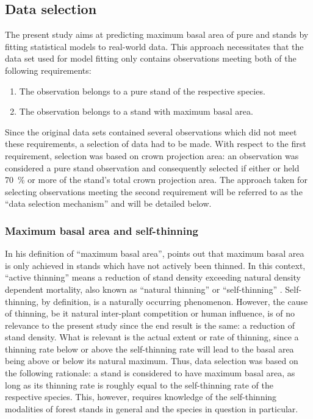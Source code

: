 \subsection{Data selection}
The present study aims at predicting maximum basal area of pure \beech{} and \spruce{} stands by fitting statistical models to real-world data.  This approach necessitates that the data set used for model fitting only contains observations meeting both of the following requirements:
\begin{enumerate}
\item The observation belongs to a pure stand of the respective species.
\item The observation belongs to a stand with maximum basal area.
\end{enumerate}
Since the original data sets contained several observations which did not meet these requirements, a selection of data had to be made.  With respect to the first requirement, selection was based on crown projection area: an observation was considered a pure stand observation and consequently selected if either \beech{} or \spruce{} held \SI{70}{\percent} or more of the stand’s total crown projection area.
The approach taken for selecting observations meeting the second requirement will be referred to as the ``data selection mechanism'' and will be detailed below.

\subsubsection{Maximum basal area and self-thinning}

In his definition of ``maximum basal area'', \textcite{Assmann1970} points out that maximum basal area is only achieved in stands which have not actively been thinned.  In this context, ``active thinning'' means a reduction of stand density exceeding natural density dependent mortality, also known as ``natural thinning'' \parencite{SAF1958} or ``self-thinning'' \parencite{Roehrig1992}.  Self-thinning, by definition, is a naturally occurring phenomenon.  However, the cause of thinning, be it natural inter-plant competition or human influence, is of no relevance to the present study since the end result is the same: a reduction of stand density.  What is relevant is the actual extent or rate of thinning, since a thinning rate below or above the self-thinning rate will lead to the basal area being above or below its natural maximum.  Thus, data selection was based on the following rationale: a stand is considered to have maximum basal area, as long as its thinning rate is roughly equal to the self-thinning rate of the respective species.  This, however, requires knowledge of the self-thinning modalities of forest stands in general and the species in question in particular.

